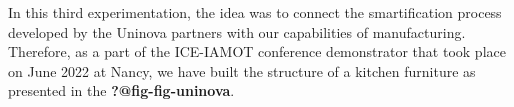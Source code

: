 \documentclass[
  11pt,
]{article}
\begin{document}
In this third experimentation, the idea was to connect the
smartification process developed by the Uninova partners with our
capabilities of manufacturing. Therefore, as a part of the ICE-IAMOT
conference demonstrator that took place on June 2022 at Nancy, we have
built the structure of a kitchen furniture as presented in the
\textbf{?@fig-fig-uninova}.

\begin{figure}

\begin{minipage}[t]{0.50\linewidth}

{\centering 


}

\end{minipage}%
%
\begin{minipage}[t]{0.50\linewidth}


\end{minipage}
\end{figure}
\end{document}
